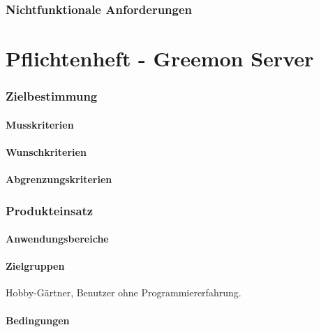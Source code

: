 \documentclass[pointlessnumbers]{scrartcl}
\begin{document}
\section{Nichtfunktionale Anforderungen}
%
%



%
%
%
%

\newpage
\part{Pflichtenheft - Greemon Server}
\newpage

\section{Zielbestimmung}
\subsection{Musskriterien}
%
%
\subsection{Wunschkriterien}
%
%
\subsection{Abgrenzungskriterien}
%
%

\section{Produkteinsatz}
\subsection{Anwendungsbereiche}
%
%
\subsection{Zielgruppen}
    Hobby-Gärtner, Benutzer ohne Programmiererfahrung. 
\subsection{Bedingungen}
%
%
\end{document}

